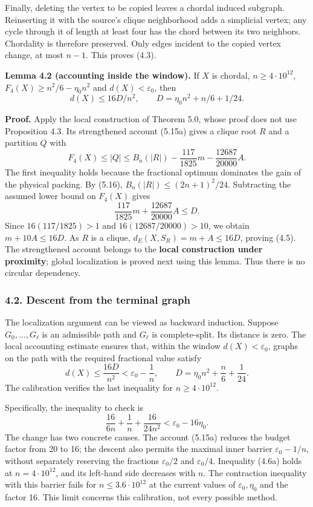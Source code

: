 \documentclass[english,11pt,a4paper]{article}
\begin{document}
Finally, deleting the vertex to be copied leaves a chordal induced subgraph. Reinserting it with the source's clique neighborhood adds a simplicial vertex; any cycle through it of length at least four has the chord between its two neighbors. Chordality is therefore preserved. Only edges incident to the copied vertex change, at most \(n-1\). This proves (4.3).


\textbf{Lemma 4.2 (accounting inside the window).} If \(X\) is chordal, \(n\ge4\cdot10^{12}\), \(F_4(X)\ge n^2/6-\eta_0n^2\) and \(d(X)<\varepsilon_0\), then \[
d(X)\le16D/n^2,\qquad D=\eta_0n^2+n/6+1/24.
\tag{4.5}
\]

\textbf{Proof.} Apply the local construction of Theorem 5.0, whose proof does not use Proposition 4.3. Its strengthened account (5.15a) gives a clique root \(R\) and a partition \(Q\) with \[
F_4(X)\le |Q|\le B_n(|R|)-\frac{117}{1825}m-\frac{12687}{20000}A.
\] The first inequality holds because the fractional optimum dominates the gain of the physical packing. By (5.16), \(B_n(|R|)\le(2n+1)^2/24\). Subtracting the assumed lower bound on \(F_4(X)\) gives \[
\frac{117}{1825}m+\frac{12687}{20000}A\le D.
\] Since \(16(117/1825)>1\) and \(16(12687/20000)>10\), we obtain \(m+10A\le16D\). As \(R\) is a clique, \(d_E(X,S_R)=m+A\le16D\), proving (4.5). The strengthened account belongs to the \textbf{local construction under proximity}; global localization is proved next using this lemma. Thus there is no circular dependency.

\subsubsection{4.2. Descent from the terminal graph}\label{descent-from-the-terminal-graph}

The localization argument can be viewed as backward induction. Suppose \(G_0,\ldots,G_\ell\) is an admissible path and \(G_\ell\) is complete-split. Its distance is zero. The local accounting estimate ensures that, within the window \(d(X)<\varepsilon_0\), graphs on the path with the required fractional value satisfy \[
d(X)\le\frac{16D}{n^2}<\varepsilon_0-\frac1n,\qquad
D=\eta_0n^2+\frac n6+\frac1{24}.
\tag{4.6}
\] The calibration verifies the last inequality for \(n\ge4\cdot10^{12}\).

Specifically, the inequality to check is \[
\frac{16}{6n}+\frac1n+\frac{16}{24n^2}
<\varepsilon_0-16\eta_0.
\tag{4.6a}
\] The change has two concrete causes. The account (5.15a) reduces the budget factor from 20 to 16; the descent also permits the maximal inner barrier \(\varepsilon_0-1/n\), without separately reserving the fractions \(\varepsilon_0/2\) and \(\varepsilon_0/4\). Inequality (4.6a) holds at \(n=4\cdot10^{12}\), and its left-hand side decreases with \(n\). The contraction inequality with this barrier fails for \(n\le3.6\cdot10^{12}\) at the current values of \(\varepsilon_0,\eta_0\) and the factor 16. This limit concerns this calibration, not every possible method.
\end{document}

